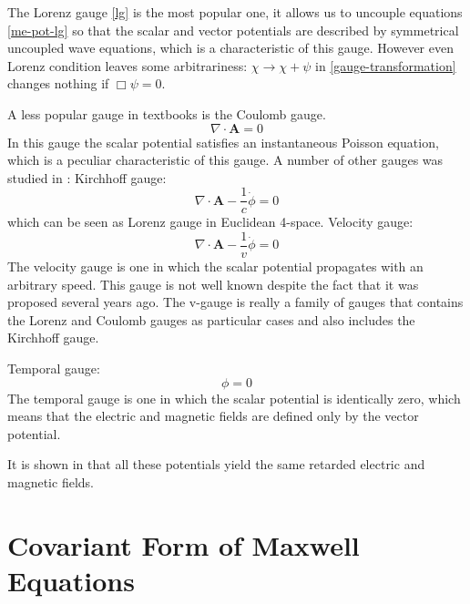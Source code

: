 The Lorenz gauge \eqref{lg} is the most popular one, it
allows us to uncouple equations \eqref{me-pot-lg}   so that the scalar and vector
potentials are described by symmetrical uncoupled wave equations,
which is a characteristic of this gauge. 
However even Lorenz condition leaves some arbitrariness: $ \chi \rightarrow \chi + \psi $ 
 in \eqref{gauge-transformation} changes nothing if $ \Box \psi=0 $.

A less popular gauge in textbooks is the Coulomb gauge.
\begin{equation}
   \label {cg}
   \nabla \cdot \bm A=0
\end{equation}
In this gauge the scalar potential satisfies an instantaneous
Poisson equation, which is a peculiar characteristic of this
gauge.
A number of other gauges was studied in \cite{Heras2007}:
Kirchhoff gauge:
\begin{equation}
   \label {kg}
    \nabla \cdot \bm A- \frac{1}{c} \dot \phi=0
\end{equation}
which can be seen as Lorenz gauge in Euclidean 4-space.
Velocity gauge:
\begin{equation}
   \label {vg}
    \nabla \cdot \bm A- \frac{1}{v} \dot \phi=0
\end{equation}
The velocity gauge is one in which the scalar
potential propagates with an arbitrary speed. This gauge is
not well known despite the fact that it was proposed several
years ago. The v-gauge is really a family of gauges that
contains the Lorenz and Coulomb gauges as particular cases
and also includes the Kirchhoff gauge.

Temporal gauge:
\begin{equation}
   \label {tg}
   \phi=0
\end{equation}
 The temporal gauge is one in which 
the scalar potential is identically zero, which means that 
the electric and magnetic fields are defined 
only by the vector potential.

It is shown in \cite{Heras2007} that  all these  potentials yield the 
same  retarded
electric and magnetic fields. 

\section {Covariant Form of Maxwell Equations}
\label{sec:ed-me-cov}

